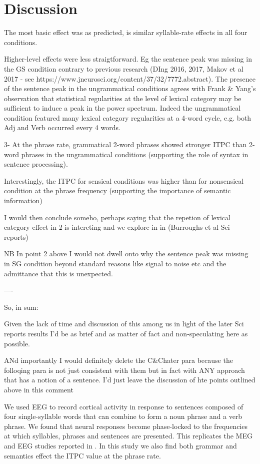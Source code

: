 \documentclass[a4paper,10pt,twoside]{article}
\begin{document}
{\section*{Discussion}

The most basic effect was as predicted, is similar syllable-rate
effects in all four conditions.

Higher-level effects were less straigtforward. Eg the sentence peak
was missing in the GS condition contrary to previous research (DIng
2016, 2017, Makov et al 2017 - see
https://www.jneurosci.org/content/37/32/7772.abstract). The presence
of the sentence peak in the ungrammatical conditions agrees with Frank
& Yang's observation that statistical regularities at the level of
lexical category may be sufficient to induce a peak in the power
spectrum. Indeed the ungrammatical condition featured many lexical
category regularities at a 4-word cycle, e.g. both Adj and Verb
occurred every 4 words.

3- At the phrase rate, grammatical 2-word
phrases showed stronger ITPC than 2-word phrases in the ungrammatical
conditions (supporting the role of syntax in sentence
processing).

Interestingly, the ITPC for sensical conditions was higher than for
nonsensical condition at the phrase frequency (supporting the
importance of semantic information)

I would then conclude someho,
perhaps saying that the repetion of lexical category effect in 2 is
intereting and we explore in in (Burroughs et al Sci reports)

NB In
point 2 above I would not dwell onto why the sentence peak was missing
in SG condition beyond standard reasons like signal to noise etc and
the admittance that this is unexpected.

----

So, in
sum:

Given the lack of time and discussion of this among us in
light of the later Sci reports results I'd be as brief and as matter
of fact and non-speculating here as possible. 

ANd importantly I
would definitely delete the C&Chater para because the folloqing para
is not just consistent with them but in fact with ANY approach that
has a notion of a sentence.  I'd just leave the discussion of hte
points outlined above in this comment





We used EEG to record cortical activity in response to sentences
composed of four single-syllable words that can combine to form a noun
phrase and a verb phrase. We found that neural responses become
phase-locked to the frequencies at which syllables, phrases and
sentences are presented. This replicates the MEG and EEG studies
reported in \cite{DingEtAl2015,DingEtAl2017}. In this study we also
find both grammar and semantics effect the ITPC value at the phrase
rate.

}
\end{document}
